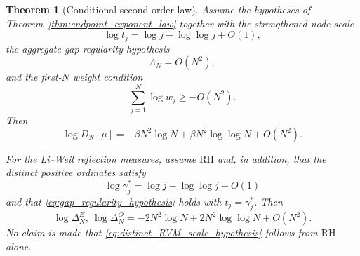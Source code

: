 \documentclass[preprint,12pt]{elsarticle}
\numberwithin{equation}{section}
\theoremstyle{plain}
\newtheorem{theorem}{Theorem}[section]
\theoremstyle{definition}
\theoremstyle{remark}
\newcommand{\RH}{\mathrm{RH}}
\begin{document}
\begin{theorem}[Conditional second-order law]
\label{thm:conditional_second_order}
Assume the hypotheses of Theorem~\ref{thm:endpoint_exponent_law} together with the strengthened node scale
\begin{equation}
\log t_j=\log j-\log\log j+O(1),
\label{eq:RVM_node_scale}
\end{equation}
the aggregate gap regularity hypothesis
\begin{equation}
\Lambda_N=O(N^2),
\label{eq:gap_regularity_hypothesis}
\end{equation}
and the first-$N$ weight condition
\begin{equation}
\sum_{j=1}^{N}\log w_j\ge -O(N^2).
\label{eq:second_order_weight_condition}
\end{equation}
Then
\begin{equation}
\log D_N[\mu]
=-\beta N^2\log N+\beta N^2\log\log N+O(N^2).
\label{eq:conditional_second_order_law}
\end{equation}

For the Li--Weil reflection measures, assume $\RH$ and, in addition, that the distinct positive ordinates satisfy
\begin{equation}
\log\gamma_j^*
=\log j-\log\log j+O(1)
\label{eq:distinct_RVM_scale_hypothesis}
\end{equation}
and that \eqref{eq:gap_regularity_hypothesis} holds with $t_j=\gamma_j^*$.  Then
\begin{equation}
\log\Delta_N^{E},\ \log\Delta_N^{O}
=-2N^2\log N+2N^2\log\log N+O(N^2).
\label{eq:conditional_second_order_li_weil}
\end{equation}
No claim is made that \eqref{eq:distinct_RVM_scale_hypothesis} follows from $\RH$ alone.
\end{theorem}
\end{document}
